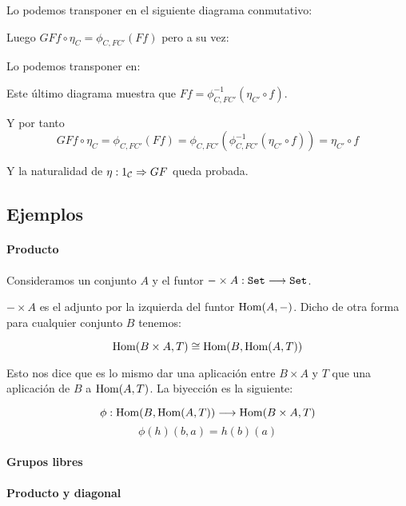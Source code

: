 Lo podemos transponer en el siguiente diagrama conmutativo:

\begin{center}
\end{center}

Luego $GFf \circ \eta_C = \phi_{C, FC'}(Ff)$ pero a su vez:


\begin{center}
\end{center}

Lo podemos transponer en:

\begin{center}
\end{center}

Este último diagrama muestra que
$Ff = \phi^{-1}_{C, FC'}(\eta_{C'} \circ f)$.


Y por tanto
$$GFf \circ \eta_C = \phi_{C, FC'}(Ff) = \phi_{C, FC'}
  (\phi^{-1}_{C,FC'}(\eta_{C'} \circ f)) = \eta_{C'} \circ f$$

Y la naturalidad de $\eta : 1_{\mathcal{C}}\Rightarrow GF$ queda probada.

\subsection{Ejemplos}
\paragraph{Producto}


Consideramos un conjunto $A$ y el funtor $-\times A : \texttt{Set}\longrightarrow \texttt{Set}$.

$-\times A$ es el adjunto por la izquierda del funtor $\operatorname{Hom}(A, -)$.
Dicho de otra forma para cualquier conjunto $B$ tenemos:

$$\operatorname{Hom}(B\times A, T) \cong \operatorname{Hom}(B, \operatorname{Hom}(A, T))$$

Esto nos dice que es lo mismo dar una aplicación entre
$B\times A$ y $T$ que una aplicación de $B$ a $\operatorname{Hom}(A, T)$. La
biyección es la siguiente:

$$\phi: \operatorname{Hom}(B, \operatorname{Hom}(A, T))\longrightarrow \operatorname{Hom}(B\times A, T)$$
$$\phi(h)(b, a) = h(b)(a)$$

\paragraph{Grupos libres}

\paragraph{Producto y diagonal}
